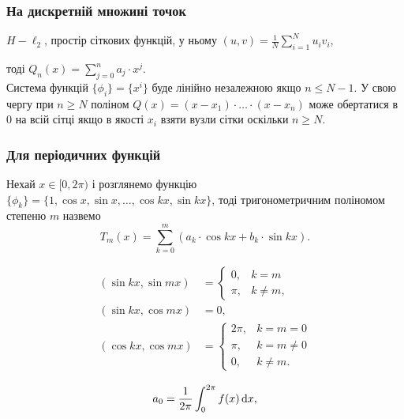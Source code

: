 

\subsubsection{На дискретній множині точок}

$H - \ell_2$, простір сіткових функцій, у ньому $(u, v) = \frac{1}{N} \sum_{i = 1}^N u_i v_i$,

тоді $Q_n(x) = \sum_{j = 0}^n a_j \cdot x^j$. \\

Система функцій $\{\phi_i\} = \{x^i\}$ буде лінійно незалежною якщо $n \le N - 1$. У свою чергу при $n \ge N$ поліном $Q(x) = (x - x_1) \cdot \ldots \cdot (x - x_n)$ може обертатися в 0 на всій сітці якщо в якості $x_i$ взяти вузли сітки оскільки $n \ge N$.

\subsubsection{Для періодичних функцій}

Нехай $x \in [0, 2 \pi)$ і розглянемо функцію $\{\phi_k\} = \{1, \cos x, \sin x, \ldots, \cos kx, \sin k x \}$, тоді тригонометричним поліномом степеню $m$ назвемо
\begin{equation}
	\label{eq:2.28}
	T_m(x) = \sum_{k = 0}^m (a_k \cdot \cos k x + b_k \cdot \sin k x).
\end{equation}

\begin{align}
	\label{eq:2.29}
	(\sin k x, \sin m x) &= \begin{cases} 0, & k = m \\ \pi, & k \ne m, \end{cases} \\
	(\sin k x, \cos m x) &= 0, \nonumber \\
	(\cos k x, \cos m x) &= \begin{cases} 2 \pi , & k = m = 0 \\ \pi, & k = m \ne 0 \\ 0, & k \ne m. \end{cases} \nonumber 
\end{align}

\begin{equation}
	\label{eq:2.30}
	a_0 = \frac{1}{2 \pi} \int_0^{2 \pi} f(x) \mathop{}\!\mathrm{d} x,
\end{equation}

